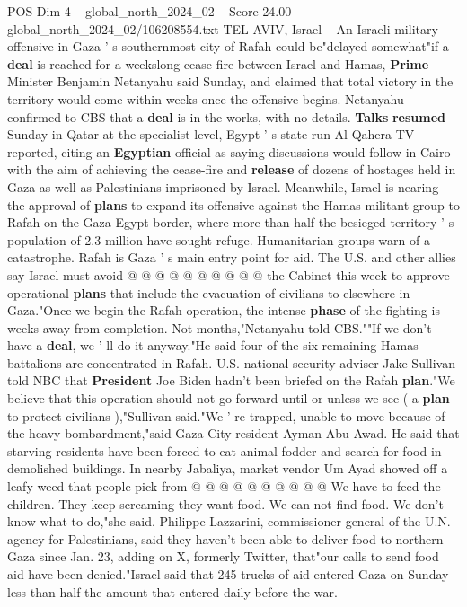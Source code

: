 \begin{textsample}{POS Dim 4 – global\_north\_2024\_02 – Score 24.00 – global\_north\_2024\_02/106208554.txt}  \label{ex:f4_pos_175}
TEL AVIV, Israel -- An Israeli military offensive in Gaza ' s southernmost city of Rafah could be"delayed somewhat"if a \textbf{deal} is reached for a weekslong cease-fire between Israel and Hamas, \textbf{Prime} Minister Benjamin Netanyahu said Sunday, and claimed that total victory in the territory would come within weeks once the offensive begins.
Netanyahu confirmed to CBS that a \textbf{deal} is in the works, with no details. \textbf{Talks} \textbf{resumed} Sunday in Qatar at the specialist level, Egypt ' s state-run Al Qahera TV reported, citing an \textbf{Egyptian} official as saying discussions would follow in Cairo with the aim of achieving the cease-fire and \textbf{release} of dozens of hostages held in Gaza as well as Palestinians imprisoned by Israel.
Meanwhile, Israel is nearing the approval of \textbf{plans} to expand its offensive against the Hamas militant group to Rafah on the Gaza-Egypt border, where more than half the besieged territory ' s population of 2.3 million have sought refuge.
Humanitarian groups warn of a catastrophe.
Rafah is Gaza ' s main entry point for aid.
The U.S. and other allies say Israel must avoid @ @ @ @ @ @ @ @ @ @ the Cabinet this week to approve operational \textbf{plans} that include the evacuation of civilians to elsewhere in Gaza."Once we begin the Rafah operation, the intense \textbf{phase} of the fighting is weeks away from completion.
Not months,"Netanyahu told CBS.""If we don't have a \textbf{deal}, we ' ll do it anyway."He said four of the six remaining Hamas battalions are concentrated in Rafah.
U.S. national security adviser Jake Sullivan told NBC that \textbf{President} Joe Biden hadn't been briefed on the Rafah \textbf{plan}."We believe that this operation should not go forward until or unless we see ( a \textbf{plan} to protect civilians ),"Sullivan said."We ' re trapped, unable to move because of the heavy bombardment,"said Gaza City resident Ayman Abu Awad.
He said that starving residents have been forced to eat animal fodder and search for food in demolished buildings.
In nearby Jabaliya, market vendor Um Ayad showed off a leafy weed that people pick from @ @ @ @ @ @ @ @ @ @ We have to feed the children.
They keep screaming they want food.
We can not find food.
We don't know what to do,"she said.
Philippe Lazzarini, commissioner general of the U.N. agency for Palestinians, said they haven't been able to deliver food to northern Gaza since Jan. 23, adding on X, formerly Twitter, that"our calls to send food aid have been denied."Israel said that 245 trucks of aid entered Gaza on Sunday -- less than half the amount that entered daily before the war.

\end{textsample}
